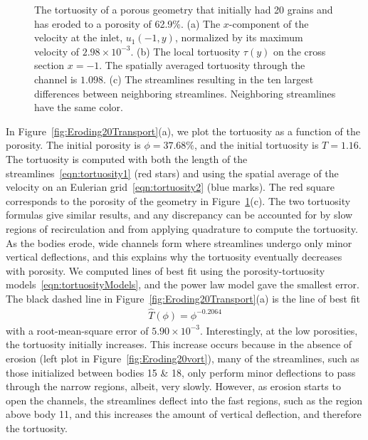 \documentclass[preprint,10pt]{elsarticle}
\begin{document}
\begin{figure}[H]
\begin{subfigure}[b]{0.5\textwidth}
\caption{}
\end{subfigure}
\caption{\label{fig:Eroding20tort} The tortuosity of a porous geometry
that initially had 20 grains and has eroded to a porosity of 62.9\%.
(a) The $x$-component of the velocity at the inlet, $u_1(-1,y)$,
normalized by its maximum velocity of $2.98 \times 10^{-3}$. (b) The
local tortuosity $\tau(y)$ on the cross section $x = -1$.  The spatially
averaged tortuosity through the channel is $1.098$.  (c) The streamlines
resulting in the ten largest differences between neighboring
streamlines.  Neighboring streamlines have the same color.}
\end{figure}

In Figure~\ref{fig:Eroding20Transport}(a), we plot the tortuosity as a
function of the porosity. The initial porosity is $\phi = 37.68\%$, and
the initial tortuosity is $T = 1.16$.  The tortuosity is computed with both
the length of the streamlines~\eqref{eqn:tortuosity1} (red stars) and
using the spatial average of the velocity on an Eulerian
grid~\eqref{eqn:tortuosity2} (blue marks).  The red square corresponds
to the porosity of the geometry in Figure~\ref{fig:Eroding20tort}(c).
The two tortuosity formulas give similar results, and any discrepancy
can be accounted for by slow regions of recirculation and from applying
quadrature to compute the tortuosity.  As the bodies erode, wide
channels form where streamlines undergo only minor vertical deflections,
and this explains why the tortuosity eventually decreases with porosity.
We computed lines of best fit using the porosity-tortuosity
models~\eqref{eqn:tortuosityModels}, and the power law model gave the
smallest error.  The  black dashed line in
Figure~\ref{fig:Eroding20Transport}(a) is the line of best fit
\begin{align}
  \widehat{T}(\phi) = \phi^{-0.2064}
\end{align}
with a root-mean-square error of $5.90 \times 10^{-3}$.  Interestingly,
at the low porosities, the tortuosity initially increases. This increase
occurs because in the absence of erosion (left plot in
Figure~\ref{fig:Eroding20vort}), many of the streamlines, such as those
initialized between bodies 15 \& 18, only perform minor deflections to
pass through the narrow regions, albeit, very slowly.  However, as
erosion starts to open the channels, the streamlines deflect into the
fast regions, such as the region above body 11, and this increases the
amount of vertical deflection, and therefore the tortuosity.
\end{document}
